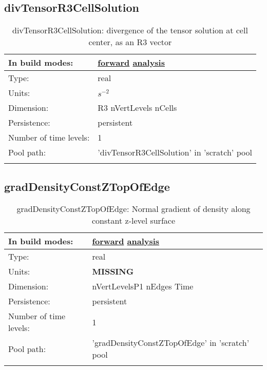 \subsection[divTensorR3CellSolution]{divTensorR3CellSolution}
\label{subsec:var_sec_scratch_divTensorR3CellSolution}
\begin{center}
\begin{longtable}{| p{2.0in} | p{4.0in} |}
        \hline 
        In build modes: & \hyperref[subsec:forward_var_tab_scratch]{forward} \hyperref[subsec:analysis_var_tab_scratch]{analysis} \\
        \hline 
        Type: & real \\
        \hline 
        Units: & $s^{-2}$ \\
        \hline 
        Dimension: & R3 nVertLevels nCells \\
        \hline 
        Persistence: & persistent \\
        \hline 
        Number of time levels: & 1 \\
        \hline 
            Pool path: & 'divTensorR3CellSolution' in 'scratch' pool
 \\
		 \hline 
    \caption{divTensorR3CellSolution: divergence of the tensor solution at cell center, as an R3 vector}
\end{longtable}
\end{center}
\subsection[gradDensityConstZTopOfEdge]{gradDensityConstZTopOfEdge}
\label{subsec:var_sec_scratch_gradDensityConstZTopOfEdge}
\begin{center}
\begin{longtable}{| p{2.0in} | p{4.0in} |}
        \hline 
        In build modes: & \hyperref[subsec:forward_var_tab_scratch]{forward} \hyperref[subsec:analysis_var_tab_scratch]{analysis} \\
        \hline 
        Type: & real \\
        \hline 
        Units: & {\bf \color{red} MISSING} \\
        \hline 
        Dimension: & nVertLevelsP1 nEdges Time \\
        \hline 
        Persistence: & persistent \\
        \hline 
        Number of time levels: & 1 \\
        \hline 
            Pool path: & 'gradDensityConstZTopOfEdge' in 'scratch' pool
 \\
		 \hline 
    \caption{gradDensityConstZTopOfEdge: Normal gradient of density along constant z-level surface}
\end{longtable}
\end{center}
